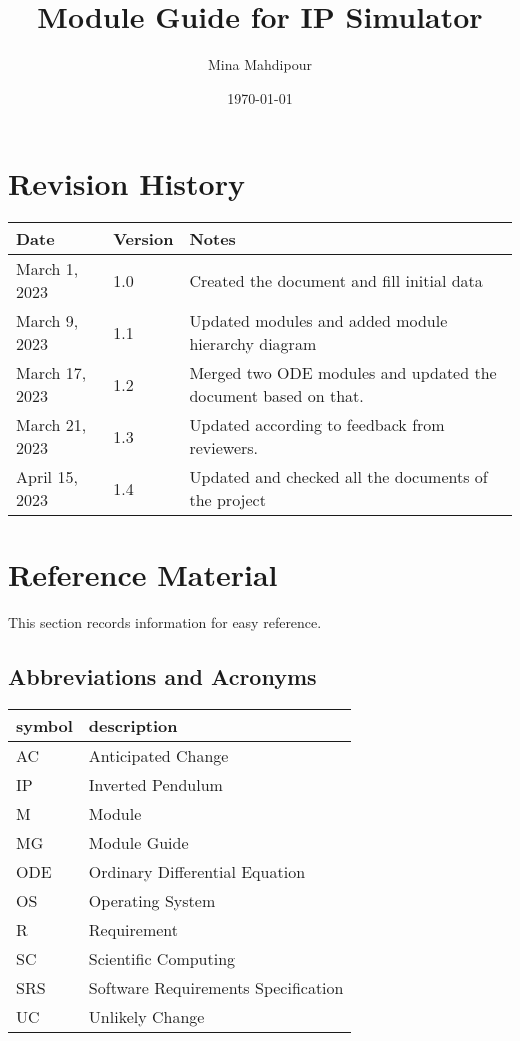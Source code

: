 \documentclass[12pt, titlepage]{article}
\begin{document}
\title{Module Guide for IP Simulator} 
\author{Mina Mahdipour}
\date{\today}

\maketitle


\section{Revision History}

\begin{tabularx}{\textwidth}{p{3cm}p{2cm}X}
\toprule {\bf Date} & {\bf Version} & {\bf Notes}\\
\midrule
March 1, 2023 & 1.0 & Created the document and fill initial data\\
March 9, 2023 & 1.1 & Updated modules and added module hierarchy diagram\\
March 17, 2023 & 1.2 & Merged two ODE modules and updated the document based on that.\\
March 21, 2023 & 1.3 & Updated according to feedback from reviewers.\\
April 15, 2023 & 1.4 & Updated and checked all the documents of the project\\
\bottomrule
\end{tabularx}

\newpage

\section{Reference Material}

This section records information for easy reference.

\subsection{Abbreviations and Acronyms}

\renewcommand{\arraystretch}{1.2}
\begin{tabular}{l l} 
  \toprule		
  \textbf{symbol} & \textbf{description}\\
  \midrule 
  AC & Anticipated Change\\
  IP & Inverted Pendulum\\
  M & Module \\
  MG & Module Guide \\
  ODE & Ordinary Differential Equation\\
  OS & Operating System \\
  R & Requirement\\
  SC & Scientific Computing \\
  SRS & Software Requirements Specification\\
  UC & Unlikely Change \\

  \bottomrule
\end{tabular}\\
\end{document}
